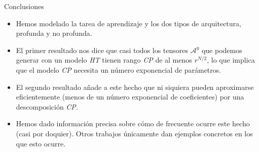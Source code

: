 \begin{frame}{Conclusiones}
	\begin{itemize}
		\item Hemos modelado la tarea de aprendizaje y los dos tipos de arquitectura, profunda y no profunda.
		\item El primer resultado nos dice que casi todos los tensores $\mathcal{A}^y$ que podemos generar con un modelo \textit{HT} tienen rango \textit{CP} de al menos $r^{N/2}$, lo que implica que el modelo \textit{CP} necesita un número exponencial de parámetros.
		\item El segundo resultado añade a este hecho que ni siquiera pueden aproximarse eficientemente (menos de un número exponencial de coeficientes) por una descomposición \textit{CP}.
		\item Hemos dado información precisa sobre cómo de frecuente ocurre este hecho (casi por doquier). Otros trabajos \cite{matematicas:descomposicion_ht} únicamente dan ejemplos concretos en los que esto ocurre.
	\end{itemize}
\end{frame}
